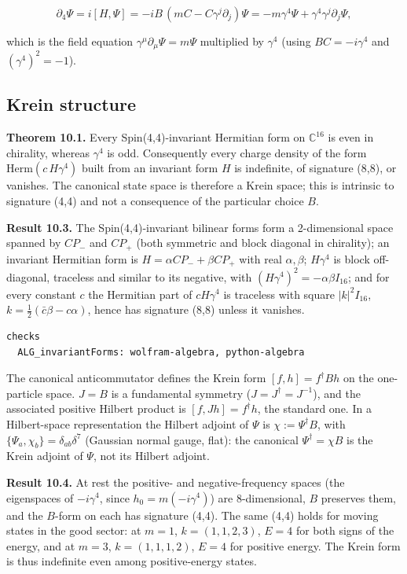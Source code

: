\documentclass[11pt]{article}
\begin{document}
\[
\partial_4\Psi=i[H,\Psi]=-iB\,(mC-C\gamma^j\partial_j)\Psi=-m\gamma^4\Psi+\gamma^4\gamma^j\partial_j\Psi,
\]

which is the field equation $\gamma^\mu\partial_\mu\Psi=m\Psi$ multiplied by $\gamma^4$ (using $BC=-i\gamma^4$ and $(\gamma^4)^2=-1$).

\subsection{Krein structure}

\textbf{Theorem 10.1.} Every Spin(4,4)-invariant Hermitian form on $\mathbb C^{16}$ is even in chirality, whereas $\gamma^4$ is odd. Consequently every charge density of the form $\mathrm{Herm}(c\,H\gamma^4)$ built from an invariant form $H$ is indefinite, of signature (8,8), or vanishes. The canonical state space is therefore a Krein space; this is intrinsic to signature (4,4) and not a consequence of the particular choice $B$.

\textbf{Result 10.3.} The Spin(4,4)-invariant bilinear forms form a 2-dimensional space spanned by $CP_-$ and $CP_+$ (both symmetric and block diagonal in chirality); an invariant Hermitian form is $H=\alpha CP_-+\beta CP_+$ with real $\alpha,\beta$; $H\gamma^4$ is block off-diagonal, traceless and similar to its negative, with $(H\gamma^4)^2=-\alpha\beta I_{16}$; and for every constant $c$ the Hermitian part of $cH\gamma^4$ is traceless with square $|k|^2I_{16}$, $k=\tfrac12(\bar c\beta-c\alpha)$, hence has signature (8,8) unless it vanishes.

\begin{Verbatim}[fontsize=\small]
checks
  ALG_invariantForms: wolfram-algebra, python-algebra
\end{Verbatim}

The canonical anticommutator defines the Krein form $[f,h]=f^\dagger Bh$ on the one-particle space. $J=B$ is a fundamental symmetry ($J=J^\dagger=J^{-1}$), and the associated positive Hilbert product is $[f,Jh]=f^\dagger h$, the standard one. In a Hilbert-space representation the Hilbert adjoint of $\Psi$ is $\chi:=\Psi^\dagger B$, with $\{\Psi_a,\chi_b\}=\delta_{ab}\delta^7$ (Gaussian normal gauge, flat): the canonical $\Psi^\dagger=\chi B$ is the Krein adjoint of $\Psi$, not its Hilbert adjoint.

\textbf{Result 10.4.} At rest the positive- and negative-frequency spaces (the eigenspaces of $-i\gamma^4$, since $h_0=m(-i\gamma^4)$) are 8-dimensional, $B$ preserves them, and the $B$-form on each has signature (4,4). The same (4,4) holds for moving states in the good sector: at $m=1$, $k=(1,1,2,3)$, $E=4$ for both signs of the energy, and at $m=3$, $k=(1,1,1,2)$, $E=4$ for positive energy. The Krein form is thus indefinite even among positive-energy states.
\end{document}
